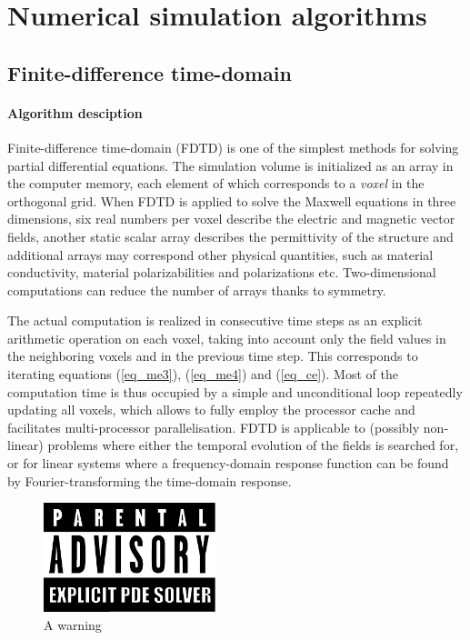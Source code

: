 \section{Numerical simulation algorithms} %
\subsection{Finite-difference time-domain} %
\paragraph{Algorithm desciption} %
Finite-difference time-domain (FDTD) is one of the simplest methods for solving partial differential equations. The simulation volume is initialized as an array in the computer memory, each element of which corresponds to a \textit{voxel} in the orthogonal grid. When FDTD is applied to solve the Maxwell equations in three dimensions, six real numbers per voxel describe the electric and magnetic vector fields, another static scalar array describes the permittivity of the structure and additional arrays may correspond other physical quantities, such as material conductivity, material polarizabilities and polarizations etc. Two-dimensional computations can reduce the number of arrays thanks to symmetry.

The actual computation is realized in consecutive time steps as an explicit arithmetic operation on each voxel, taking into account only the field values in the neighboring voxels and in the previous time step. This corresponds to iterating equations (\ref{eq_me3}), (\ref{eq_me4}) and (\ref{eq_ce}). %
Most of the computation time is thus occupied by a simple and unconditional loop repeatedly updating all voxels, which allows to fully employ the processor cache and facilitates multi-processor parallelisation. FDTD is applicable to (possibly non-linear) problems where either the temporal evolution of the fields is searched for, or for linear systems where a frequency-domain response function can be found by Fourier-transforming the time-domain response. 
\begin{figure}[h] \caption{A warning} \label{fg_parental} \centering 
	\includegraphics[width=5cm]{img/Parental_Advisory_label.pdf}
\end{figure}

